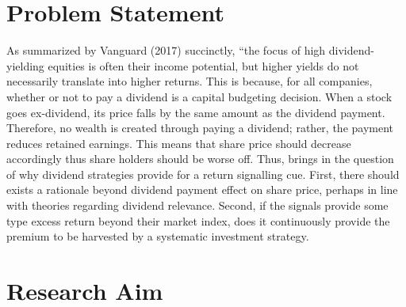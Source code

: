 \documentclass[10pt,preprint, authoryear]{elsarticle}
\numberwithin{equation}{section}
\numberwithin{figure}{section}
\numberwithin{table}{section}
\begin{document}

\headsep 35pt %




\hypertarget{problem-statement}{%
\section*{Problem Statement}\label{problem-statement}}

As summarized by Vanguard (2017) succinctly, ``the focus of high
dividend-yielding equities is often their income potential, but higher
yields do not necessarily translate into higher returns. This is
because, for all companies, whether or not to pay a dividend is a
capital budgeting decision. When a stock goes ex-dividend, its price
falls by the same amount as the dividend payment. Therefore, no wealth
is created through paying a dividend; rather, the payment reduces
retained earnings. This means that share price should decrease
accordingly thus share holders should be worse off. Thus, brings in the
question of why dividend strategies provide for a return signalling cue.
First, there should exists a rationale beyond dividend payment effect on
share price, perhaps in line with theories regarding dividend relevance.
Second, if the signals provide some type excess return beyond their
market index, does it continuously provide the premium to be harvested
by a systematic investment strategy.

\hypertarget{research-aim}{%
\section*{Research Aim}\label{research-aim}}
\end{document}
